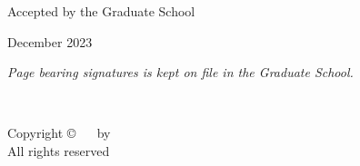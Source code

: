 \vfill

{\hfill
\begin{minipage}{3.625in}
\begin{center}
Accepted by the Graduate School 

December 2023 %


\end{center}
\end{minipage}
}

\vfill

\begin{center}
    {\scriptsize \it Page bearing signatures is kept on file in the Graduate School.}
\end{center}


\pagebreak
\restoregeometry %

\thispagestyle{empty}
~

\vfill{}

\begin{center} 
Copyright \copyright ~ \the\year ~ by \myname \\ %

All rights reserved
\end{center}

\pagebreak

